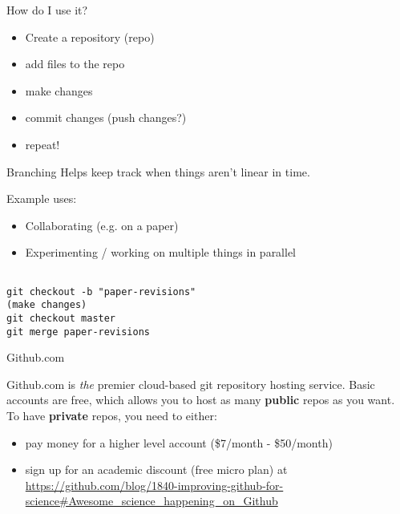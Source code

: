 \documentclass{beamer}
\begin{document}
\begin{frame}{How do I use it?}
  \begin{itemize}
  \item Create a repository (repo)
  \item add files to the repo
  \item make changes
  \item commit changes (push changes?)
  \item repeat!
  \end{itemize}

\end{frame}

\begin{frame}[fragile]
    \begin{block}{Branching}
        Helps keep track when things aren't linear in time.

        Example uses:
        \begin{itemize}
            \item Collaborating (e.g. on a paper)
            \item Experimenting / working on multiple things in parallel
        \end{itemize}

        \begin{verbatim}

git checkout -b "paper-revisions"
(make changes)
git checkout master
git merge paper-revisions

        \end{verbatim}
    \end{block}
\end{frame}

\begin{frame}{Github.com}

  Github.com is \textit{the} premier cloud-based git repository hosting
  service. Basic accounts are free, which allows you to host as many
  \textbf{public} repos as you want. To have \textbf{private} repos,
  you need to either:
  \begin{itemize}
  \item pay money for a higher level account (\$7/month - \$50/month)
  \item sign up for an academic discount (free micro plan) at  \url{https://github.com/blog/1840-improving-github-for-science\#Awesome_science_happening_on_Github}
  \end{itemize}


\end{frame}
\end{document}
